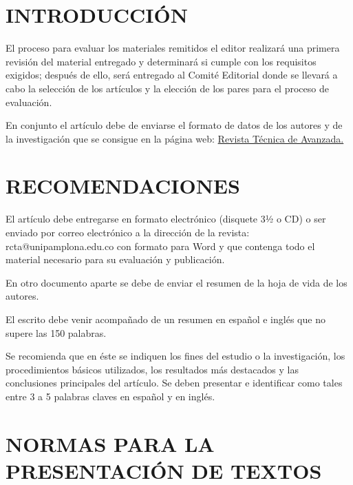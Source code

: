 \documentclass[10pt]{article}
\begin{document}
\vspace{3mm}

\setlength{\columnsep}{1cm}

\renewcommand{\tablename}{Tabla}

\begin{multicols}{2}
\fontsize{10}{12}\selectfont

\section{INTRODUCCIÓN}

El proceso para evaluar los materiales remitidos el editor realizará una primera revisión del material entregado y determinará si cumple con los requisitos exigidos; después de ello, será entregado al Comité Editorial donde se llevará a cabo la selección de los artículos y la elección de los pares para el proceso de evaluación.

En conjunto el artículo debe de enviarse el formato de datos de los autores y de la investigación que se consigue en la página web: \href{http://www.unipamplona.edu.co/unipamplona/hermesoft/portalIG/home_18/recursos/01_general/contenidos/13052008/rev_tec_avanzada.jsp}{Revista Técnica de Avanzada.}

\section{RECOMENDACIONES}

El artículo debe entregarse en formato electrónico (disquete 3½ o CD) o ser enviado por correo electrónico a la dirección de la revista: rcta@unipamplona.edu.co con formato para Word y que contenga todo el material necesario para su evaluación y publicación.

En otro documento aparte se debe de enviar el resumen de la hoja de vida de los autores.

El escrito debe venir acompañado de un resumen en español e inglés que no supere las 150 palabras.

Se recomienda que en éste se indiquen los fines del estudio o la investigación, los procedimientos básicos utilizados, los resultados más destacados y las conclusiones principales del artículo. Se deben presentar e identificar como tales entre 3 a 5 palabras claves en español y en inglés.

\section{NORMAS PARA LA PRESENTACIÓN DE TEXTOS}


\end{multicols}
\end{document}
